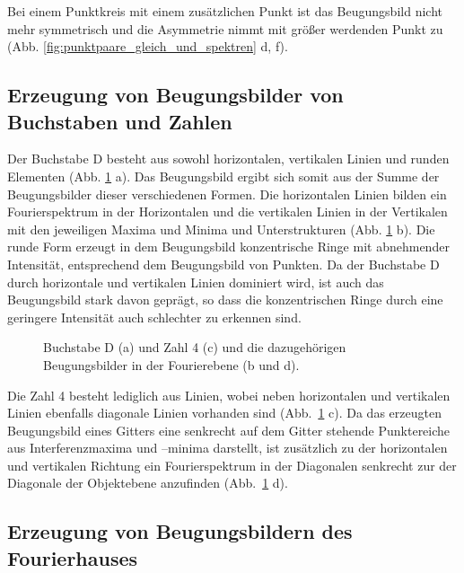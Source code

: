 Bei einem Punktkreis mit einem zusätzlichen Punkt ist das Beugungsbild nicht mehr symmetrisch und die Asymmetrie nimmt mit größer werdenden Punkt zu (Abb. \ref{fig:punktpaare_gleich_und_spektren} d, f).


\subsection{Erzeugung von Beugungsbilder von Buchstaben und Zahlen}

Der Buchstabe D besteht aus sowohl horizontalen, vertikalen Linien und runden Elementen (Abb. \ref{fig:ziffern_mit_spektren} a). Das Beugungsbild ergibt sich somit aus der Summe der Beugungsbilder dieser verschiedenen Formen. Die horizontalen Linien bilden ein Fourierspektrum in der Horizontalen und die vertikalen Linien in der Vertikalen mit den jeweiligen Maxima und Minima und Unterstrukturen (Abb. \ref{fig:ziffern_mit_spektren} b). Die runde Form erzeugt in dem Beugungsbild konzentrische Ringe mit abnehmender Intensität, entsprechend dem Beugungsbild von Punkten. Da der Buchstabe D durch horizontale und vertikalen Linien dominiert wird, ist auch das Beugungsbild stark davon geprägt, so dass die konzentrischen Ringe durch eine geringere Intensität auch schlechter zu erkennen sind.

\begin{figure}[h]
	\centering
	\caption[Ziffern mit Fourierspektren]{
		Buchstabe D (a) und Zahl 4 (c) und die dazugehörigen Beugungsbilder in der Fourierebene (b und d).
	}
	\label{fig:ziffern_mit_spektren}
\end{figure}

Die Zahl 4 besteht lediglich aus Linien, wobei neben horizontalen und vertikalen Linien ebenfalls diagonale Linien vorhanden sind (Abb.~\ref{fig:ziffern_mit_spektren} c). Da das erzeugten Beugungsbild eines Gitters eine senkrecht auf dem Gitter stehende Punktereiche aus Interferenzmaxima und –minima darstellt, ist zusätzlich zu der horizontalen und vertikalen Richtung ein Fourierspektrum in der Diagonalen senkrecht zur der Diagonale der Objektebene anzufinden
(Abb.~\ref{fig:ziffern_mit_spektren} d).

\subsection{Erzeugung von Beugungsbildern des Fourierhauses}

